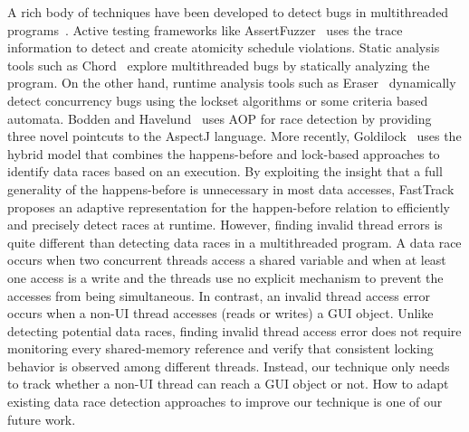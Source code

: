 A rich body of techniques have been developed to detect bugs in multithreaded programs~\cite{Huang:2011:PPC:2001420.2001438, Weeratunge:2010, Huang:2011:EST}.
Active testing frameworks like AssertFuzzer~\cite{Sen:2008} uses the trace information to detect
and create atomicity schedule violations. Static analysis tools such as Chord~\cite{Naik:2006}
 explore multithreaded bugs by statically analyzing the program. On the
other hand, runtime analysis tools such as Eraser~\cite{Savage:1997}  dynamically detect concurrency bugs using the lockset
algorithms or some criteria based automata. Bodden and Havelund~\cite{Bodden:2008} uses AOP for
race detection by providing three novel pointcuts to the AspectJ language. More recently,
Goldilock~\cite{Elmas:2007} uses the hybrid model that combines the happens-before and lock-based
approaches to identify data races based on an execution. By exploiting the insight
that a full generality of the happens-before is unnecessary in most data accesses,
FastTrack~\cite{Flanagan:2009} proposes an adaptive representation for the happen-before
relation to efficiently and precisely detect races at runtime. However, finding
invalid thread errors is quite different than detecting data races in
a multithreaded program. A data race occurs when two concurrent threads access
a shared variable and when at least one access is a write and the threads
use no explicit mechanism to prevent the accesses from being simultaneous. In contrast,
an invalid thread access error occurs when a non-UI thread accesses (reads or writes) a GUI object.
Unlike detecting potential data races, finding invalid thread access error does not require monitoring every shared-memory
reference and verify that consistent locking behavior is observed among different threads. Instead,
our technique only needs to track whether a non-UI thread can reach a GUI object or not.
How to adapt existing data race detection approaches to 
improve our technique is one of our future work.



